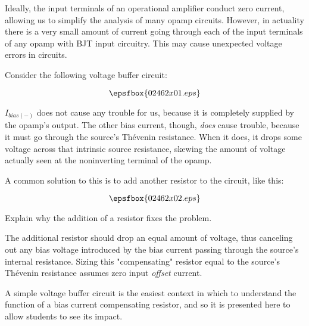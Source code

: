 

Ideally, the input terminals of an operational amplifier conduct zero current, allowing us to simplify the analysis of many opamp circuits.  However, in actuality there is a very small amount of current going through each of the input terminals of any opamp with BJT input circuitry.  This may cause unexpected voltage errors in circuits.

Consider the following voltage buffer circuit:

$$\epsfbox{02462x01.eps}$$

$I_{bias(-)}$ does not cause any trouble for us, because it is completely supplied by the opamp's output.  The other bias current, though, {\it does} cause trouble, because it must go through the source's Th\'evenin resistance.  When it does, it drops some voltage across that intrinsic source resistance, skewing the amount of voltage actually seen at the noninverting terminal of the opamp.

A common solution to this is to add another resistor to the circuit, like this:

$$\epsfbox{02462x02.eps}$$

Explain why the addition of a resistor fixes the problem.







The additional resistor should drop an equal amount of voltage, thus canceling out any bias voltage introduced by the bias current passing through the source's internal resistance.  Sizing this "compensating" resistor equal to the source's Th\'evenin resistance assumes zero input {\it offset} current.







A simple voltage buffer circuit is the easiest context in which to understand the function of a bias current compensating resistor, and so it is presented here to allow students to see its impact.




